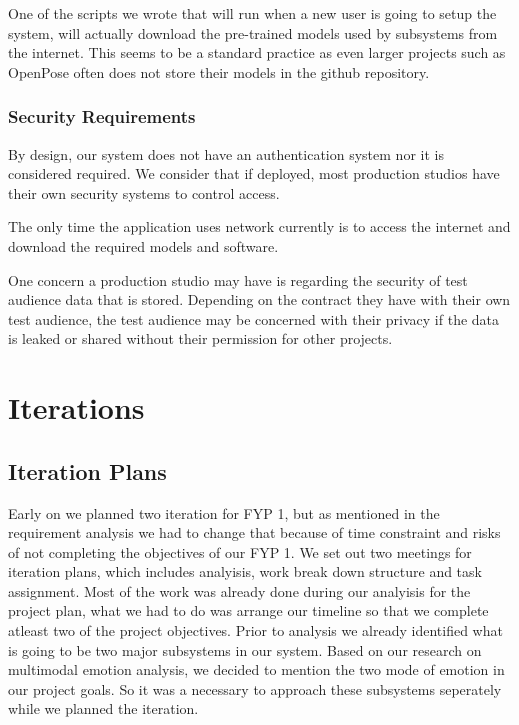\documentclass[12pt,a4paper,man]{report}
\begin{document}
One of the scripts we wrote that will run when a new user is going to setup the system, will actually download the pre-trained models used by subsystems from the internet. This seems to be a standard practice as even larger projects such as OpenPose often does not store their models in the github repository. 

\section{Security Requirements}
\label{sec:orgc9f0de8}
By design, our system does not have an authentication system nor it is considered required. We consider that if deployed, most production studios have their own security systems to control access.

The only time the application uses network currently is to access the internet and download the required models and software.

One concern a production studio may have is regarding the security of test audience data that is stored. Depending on the contract they have with their own test audience, the test audience may be concerned with their privacy if the data is leaked or shared without their permission for other projects.



\part{Iterations}
\label{sec:org0b66f6c}
\chapter{Iteration Plans}
\label{sec:orge8ecea7}
Early on we planned two iteration for FYP 1, but as mentioned in the requirement analysis we had to change that because of time constraint and risks of not completing the objectives of our FYP 1. We set out two meetings for iteration plans, which includes analyisis, work break down structure and task assignment. Most of the work was already done during our analyisis for the project plan, what we had to do was arrange our timeline so that we complete atleast two of the project objectives. Prior to analysis we already identified what is going to be two major subsystems in our system. Based on our research on multimodal emotion analysis, we decided to mention the two mode of emotion in our project goals. So it was a necessary to approach these subsystems seperately while we planned the iteration.
\end{document}
